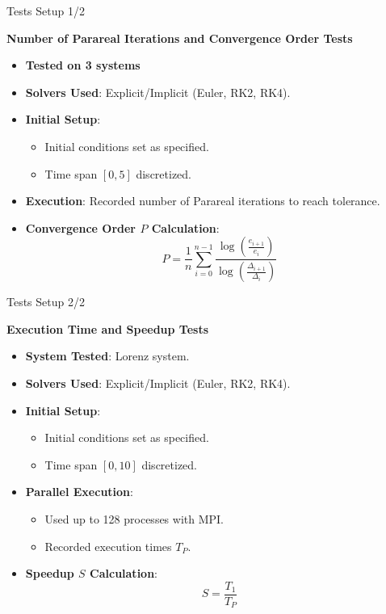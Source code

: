 \documentclass[aspectratio=169,xcolor=dvipsnames, t]{beamer}
\begin{document}
\begin{frame}{Tests Setup 1/2}
    \begin{block}{\textbf{Number of Parareal Iterations and Convergence Order Tests}}
        \begin{itemize}
            \item \textbf{Tested on 3 systems}
            \item \textbf{Solvers Used}: Explicit/Implicit (Euler, RK2, RK4).
            \item \textbf{Initial Setup}: 
                \begin{itemize}
                    \item Initial conditions set as specified.
                    \item Time span $[0, 5]$ discretized.
                \end{itemize}
            \item \textbf{Execution}: Recorded number of Parareal iterations to reach tolerance.
            \item \textbf{Convergence Order $P$ Calculation}:
                \[
                P = \frac{1}{n} \sum_{i=0}^{n-1} \frac{\log\left(\frac{e_{i+1}}{e_i}\right)}{\log\left(\frac{\Delta_{i+1}}{\Delta_i}\right)}
                \]
        \end{itemize}
    \end{block}
\end{frame}

\begin{frame}{Tests Setup 2/2}
    \begin{block}{\textbf{Execution Time and Speedup Tests}}
        \begin{itemize}
            \item \textbf{System Tested}: Lorenz system.
            \item \textbf{Solvers Used}: Explicit/Implicit (Euler, RK2, RK4).
            \item \textbf{Initial Setup}: 
                \begin{itemize}
                    \item Initial conditions set as specified.
                    \item Time span $[0, 10]$ discretized.
                \end{itemize}
            \item \textbf{Parallel Execution}: 
                \begin{itemize}
                    \item Used up to 128 processes with MPI.
                    \item Recorded execution times $T_P$.
                \end{itemize}
            \item \textbf{Speedup $S$ Calculation}:
                \[
                S = \frac{T_1}{T_P}
                \]
        \end{itemize}
    \end{block}
\end{frame}
\end{document}
